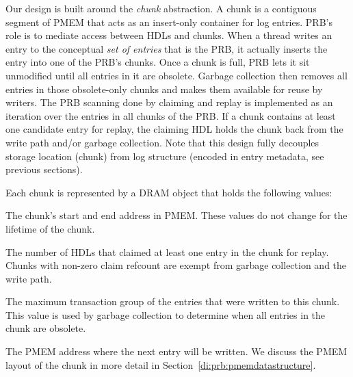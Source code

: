 \documentclass[12pt,a4paper,twoside]{book}
\begin{document}
Our design is built around the \textit{chunk} abstraction.
A chunk is a contiguous segment of PMEM that acts as an insert-only container for log entries.
PRB's role is to mediate access between HDLs and chunks.
When a thread writes an entry to the conceptual \textit{set of entries} that is the PRB, it actually inserts the entry into one of the PRB's chunks.
Once a chunk is full, PRB lets it sit unmodified until all entries in it are obsolete.
Garbage collection then removes all entries in those obsolete-only chunks and makes them available for reuse by writers.
The PRB scanning done by claiming and replay is implemented as an iteration over the entries in all chunks of the PRB.
If a chunk contains at least one candidate entry for replay, the claiming HDL holds the chunk back from the write path and/or garbage collection.
Note that this design fully decouples storage location (chunk) from log structure (encoded in entry metadata, see previous sections).

Each chunk is represented by a DRAM object that holds the following values:
\begin{description}[noitemsep]
    \item[PMEM location] The chunk's start and end address in PMEM. These values do not change for the lifetime of the chunk.
    \item[Claim refcount] The number of HDLs that claimed at least one entry in the chunk for replay.
        Chunks with non-zero claim refcount are exempt from garbage collection and the write path.
    \item[Max txg] The maximum transaction group of the entries that were written to this chunk.
        This value is used by garbage collection to determine when all entries in the chunk are obsolete.
    \item[Write position] The PMEM address where the next entry will be written.
        We discuss the PMEM layout of the chunk in more detail in Section~\ref{di:prb:pmemdatastructure}.
\end{description}
\end{document}

